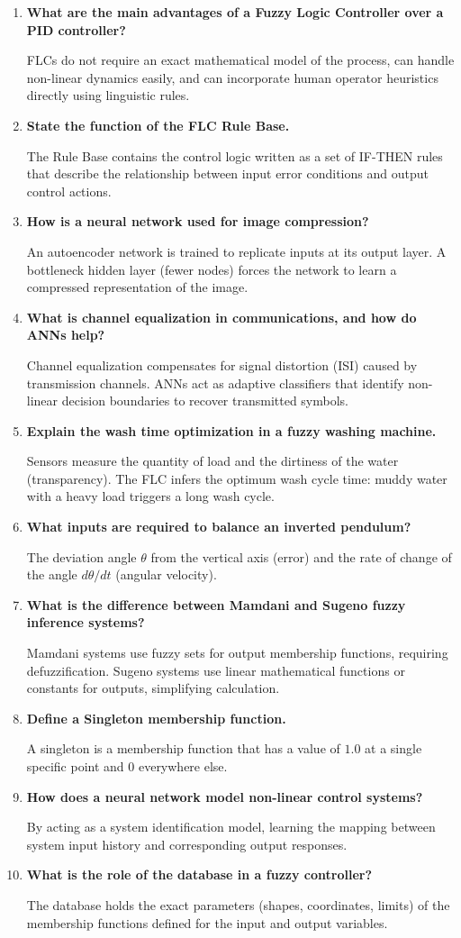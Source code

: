 \documentclass[12pt,a4paper]{article}
\newcommand{\Q}[1]{\textbf{#1}\par\noindent\ignorespaces}
\begin{document}
\begin{tcolorbox}[exambox, title={\textbf{Frequently Asked / Viva Questions}}]
\begin{enumerate}[leftmargin=*, itemsep=3.5pt, label=\arabic*.]
  \item \Q{What are the main advantages of a Fuzzy Logic Controller over a PID controller?} FLCs do not require an exact mathematical model of the process, can handle non-linear dynamics easily, and can incorporate human operator heuristics directly using linguistic rules.
  \item \Q{State the function of the FLC Rule Base.} The Rule Base contains the control logic written as a set of IF-THEN rules that describe the relationship between input error conditions and output control actions.
  \item \Q{How is a neural network used for image compression?} An autoencoder network is trained to replicate inputs at its output layer. A bottleneck hidden layer (fewer nodes) forces the network to learn a compressed representation of the image.
  \item \Q{What is channel equalization in communications, and how do ANNs help?} Channel equalization compensates for signal distortion (ISI) caused by transmission channels. ANNs act as adaptive classifiers that identify non-linear decision boundaries to recover transmitted symbols.
  \item \Q{Explain the wash time optimization in a fuzzy washing machine.} Sensors measure the quantity of load and the dirtiness of the water (transparency). The FLC infers the optimum wash cycle time: muddy water with a heavy load triggers a long wash cycle.
  \item \Q{What inputs are required to balance an inverted pendulum?} The deviation angle $\theta$ from the vertical axis (error) and the rate of change of the angle $d\theta/dt$ (angular velocity).
  \item \Q{What is the difference between Mamdani and Sugeno fuzzy inference systems?} Mamdani systems use fuzzy sets for output membership functions, requiring defuzzification. Sugeno systems use linear mathematical functions or constants for outputs, simplifying calculation.
  \item \Q{Define a Singleton membership function.} A singleton is a membership function that has a value of $1.0$ at a single specific point and $0$ everywhere else.
  \item \Q{How does a neural network model non-linear control systems?} By acting as a system identification model, learning the mapping between system input history and corresponding output responses.
  \item \Q{What is the role of the database in a fuzzy controller?} The database holds the exact parameters (shapes, coordinates, limits) of the membership functions defined for the input and output variables.
\end{enumerate}
\end{tcolorbox}
\end{document}

